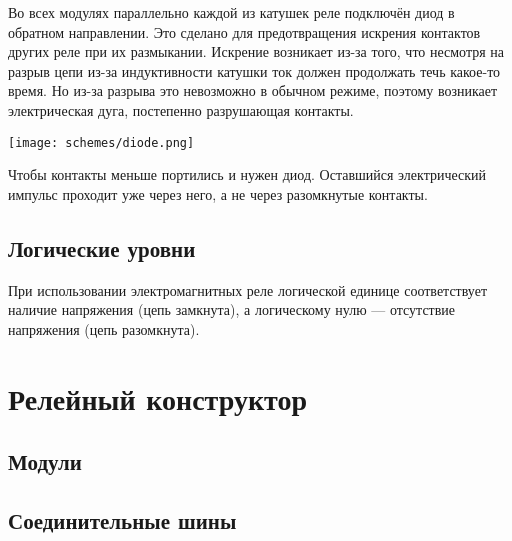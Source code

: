 Во всех модулях параллельно каждой из катушек реле подключён диод в обратном
направлении. Это сделано для предотвращения искрения контактов других реле
при их размыкании.
Искрение возникает из-за того, что несмотря на разрыв цепи из-за индуктивности катушки
ток должен продолжать течь какое-то время. Но из-за разрыва это невозможно
в обычном режиме, поэтому возникает электрическая дуга, постепенно разрушающая контакты.

\begin{center}
\texttt{[image: schemes/diode.png]}
\end{center}

Чтобы контакты меньше портились и нужен диод. Оставшийся электрический импульс проходит
уже через него, а не через разомкнутые контакты.

\section{Логические уровни}

При использовании электромагнитных реле логической единице соответствует
наличие напряжения (цепь замкнута), а логическому нулю --- отсутствие напряжения
(цепь разомкнута).


\chapter{Релейный конструктор}

\section{Модули}

\section{Соединительные шины}

